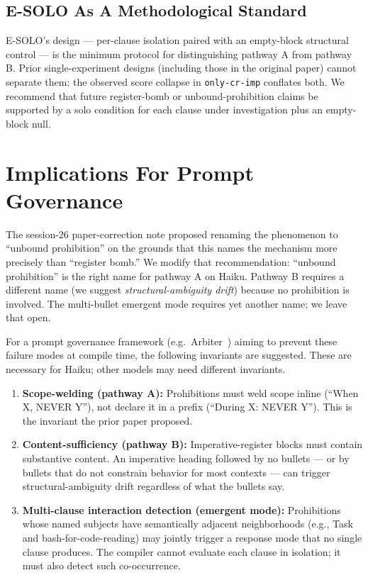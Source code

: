 \documentclass[11pt,a4paper]{article}
\begin{document}
\subsection{E-SOLO As A Methodological Standard}

E-SOLO's design --- per-clause isolation paired with an empty-block
structural control --- is the minimum protocol for distinguishing
pathway A from pathway B. Prior single-experiment designs (including
those in the original paper) cannot separate them: the observed
score collapse in \texttt{only-cr-imp} conflates both. We recommend
that future register-bomb or unbound-prohibition claims be supported
by a solo condition for each clause under investigation plus an
empty-block null.

\section{Implications For Prompt Governance}

The session-26 paper-correction note proposed renaming the
phenomenon to ``unbound prohibition'' on the grounds that this
names the mechanism more precisely than ``register bomb.'' We
modify that recommendation: ``unbound prohibition'' is the right
name for pathway A on Haiku. Pathway B requires a different name
(we suggest \emph{structural-ambiguity drift}) because no
prohibition is involved. The multi-bullet emergent mode requires
yet another name; we leave that open.

For a prompt governance framework
(e.g.~Arbiter~\citep{mason2026arbiter}) aiming to prevent these
failure modes at compile time, the following invariants are
suggested. These are necessary for Haiku; other models may need
different invariants.

\begin{enumerate}[leftmargin=*]
\item \textbf{Scope-welding (pathway A):} Prohibitions must weld
scope inline (``When X, NEVER Y''), not declare it in a prefix
(``During X: NEVER Y''). This is the invariant the prior paper
proposed.

\item \textbf{Content-sufficiency (pathway B):} Imperative-register
blocks must contain substantive content. An imperative heading
followed by no bullets --- or by bullets that do not constrain
behavior for most contexts --- can trigger structural-ambiguity
drift regardless of what the bullets say.

\item \textbf{Multi-clause interaction detection (emergent mode):}
Prohibitions whose named subjects have semantically adjacent
neighborhoods (e.g., Task and bash-for-code-reading) may jointly
trigger a response mode that no single clause produces. The
compiler cannot evaluate each clause in isolation; it must
also detect such co-occurrence.
\end{enumerate}
\end{document}

